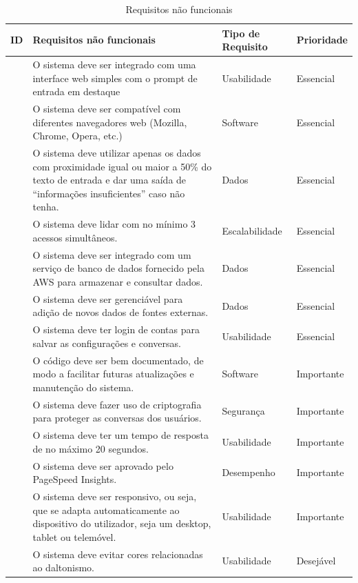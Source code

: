 \documentclass[
	12pt,				%
	openright,			%
	oneside,			    %
	a4paper,				%
	english,			%
	french,			%
	spanish,			%
	brazil			%
	]{abntex2}
\begin{document}
\begin{table}[htb]
\ABNTEXfontereduzida
\caption[Requisitos não funcionais]{Requisitos não funcionais}
\label{tab-nivinv}
\hspace*{-1.7cm}
\begin{tabular}{|>{\centering\arraybackslash}m{1.2cm}|>{\centering\arraybackslash}m{10cm}|>{\centering\arraybackslash}m{2.25cm}|>{\centering\arraybackslash}m{2.2cm}|}
  \hline
   \textbf{ID} & \textbf{Requisitos não funcionais}  & \textbf{Tipo de Requisito}  & \textbf{Prioridade}  \\
    \hline
    [RNF01]& O sistema deve ser integrado com uma interface web simples com o prompt de entrada em destaque & Usabilidade &
    Essencial  \\
    \hline
    [RNF02] & O sistema deve ser compatível com diferentes navegadores web (Mozilla, Chrome, Opera, etc.) & Software & Essencial \\
    \hline
    [RFN03] & O sistema deve utilizar apenas os dados com proximidade igual ou maior a 50\% do texto de entrada e dar uma saída de “informações insuficientes” caso não tenha. & Dados & Essencial \\
    \hline
    [RNF04] & O sistema deve lidar com no mínimo 3 acessos simultâneos. & Escalabilidade & Essencial \\
    \hline
    [RNF05] & O sistema deve ser integrado com um serviço de banco de dados fornecido pela AWS para armazenar e consultar dados. & Dados & Essencial \\
    \hline
    [RNF06] & O sistema deve ser gerenciável para adição de novos dados de fontes externas. & Dados & Essencial \\
    \hline
    [RNF07] & O sistema deve ter login de contas para salvar as configurações e conversas. & Usabilidade & Essencial \\
    \hline
    [RNF08] & O código deve ser bem documentado, de modo a facilitar futuras atualizações e manutenção do sistema. & Software & Importante \\
    \hline
    [RNF09] & O sistema deve fazer uso de criptografia para proteger as conversas dos usuários. & Segurança & Importante \\
    \hline
    [RNF10] & O sistema deve ter um tempo de resposta de no máximo 20 segundos. & Usabilidade & Importante \\
    \hline
    [RNF11] & O sistema deve ser aprovado pelo PageSpeed Insights. & Desempenho & Importante \\
    \hline
    [RNF12] & O sistema deve ser responsivo, ou seja, que se adapta automaticamente ao dispositivo do utilizador, seja um desktop, tablet ou telemóvel. & Usabilidade & Importante \\
    \hline
    [RNF13] & O sistema deve evitar cores relacionadas ao daltonismo. & Usabilidade & Desejável \\
    \hline
\end{tabular}
\end{table}
\end{document}
